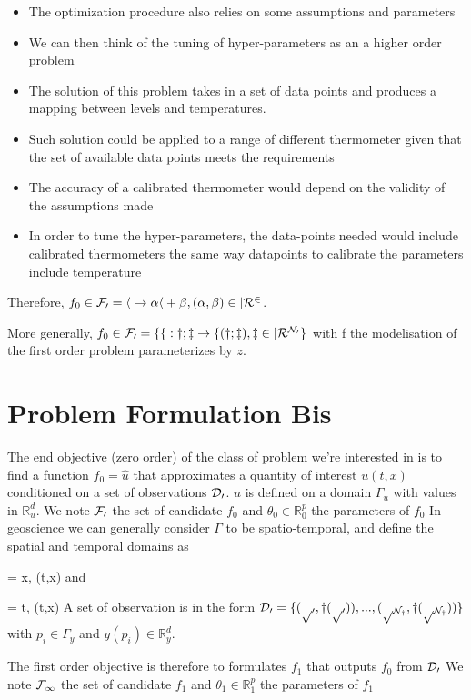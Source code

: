 \begin{bibunit}
\begin{itemize}
  \item The optimization procedure also relies on some assumptions and parameters
  \item We can then think of the tuning of hyper-parameters as an a higher order problem
  \item The solution of this problem takes in a set of data points and produces a mapping between levels and temperatures.
  \item Such solution could be applied to a range of different thermometer given that the set of available data points meets the requirements
  \item The accuracy of a calibrated thermometer would depend on the validity of the assumptions made
  \item In order to tune the hyper-parameters, the data-points needed would include calibrated thermometers the same way datapoints to calibrate the parameters include temperature
\end{itemize}


  Therefore, $f_0 \in \cal{F}_0 = { h \to \alpha h + \beta , (\alpha, \beta) \in |R^2 }$.

  More generally, $f_0 \in \cal{F}_0 = \{ f: y; z \to f(y; z), z \in |R^{N_0} \}$ with f the modelisation of the first order problem parameterizes by $z$.

\section{Problem Formulation Bis}
\label{sec:chap1_problem_formbis}

  The end objective (zero order) of the class of problem we're interested in is to find a function $f_0=\hat{u}$  that approximates a quantity of interest $u(t, x)$ conditioned on a set of observations $\cal{D}_0$.
   $u$ is defined on a domain $\Gamma_u$ with values in $\mathbb{R}^d_u$.
  We note $\cal{F}_0$  the set of candidate $f_0$ and $\theta_0 \in \mathbb{R}^p_0$ the parameters of $f_0$
  In geoscience we can generally consider $\Gamma$ to be spatio-temporal, and define the spatial and temporal domains  as {\Omega = {x, (t,x) \in \Gamma} and {\Tau = {t, (t,x) \in \Gamma}
  A set of observation is in the form $\cal{D}_0 = \{(p_0, y(p_0)), ..., (p_{N_y}, y(p_{N_y})) \}$ with  $p_i \in \Gamma_y$ and $y(p_i) \in \mathbb{R}^d_y$.


  The first order objective is therefore to formulates $f_1$ that outputs $f_0$ from $\cal{D}_0$
  We note $\cal{F}_1$  the set of candidate $f_1$ and $\theta_1 \in \mathbb{R}^p_1$ the parameters of $f_1$

}}
\end{bibunit}
